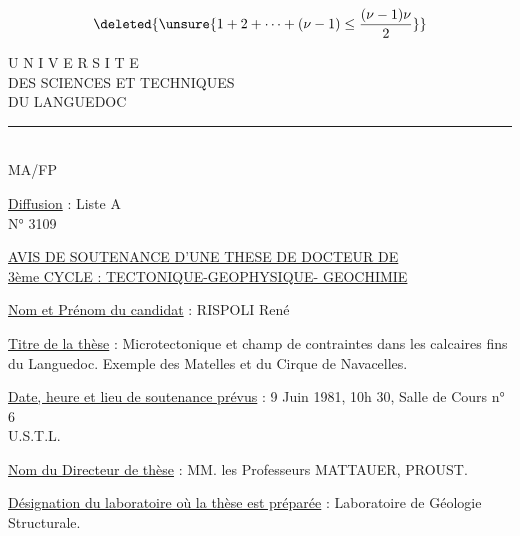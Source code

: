 

\[
\deleted{\unsure{1+2+\cdots+(\nu-1)\leq\frac{(\nu-1)\nu}{2}}}
\]


\begin{center}
U N I V E R S I T E\\
DES SCIENCES ET TECHNIQUES\\
DU LANGUEDOC\\
\rule{2.8cm}{.4pt}\\
MA/FP
\end{center}
\uline{Diffusion} : Liste A\\
N° 3109

\begin{center}
\uline{AVIS DE SOUTENANCE D'UNE THESE DE DOCTEUR DE}\\
\uline{3ème CYCLE : TECTONIQUE-GEOPHYSIQUE- GEOCHIMIE}
\end{center}

\uline{Nom et Prénom du candidat} : RISPOLI René

\uline{Titre de la thèse} : Microtectonique et champ de contraintes dans les calcaires fins du Languedoc. Exemple des Matelles et du Cirque de Navacelles.

\uline{Date, heure et lieu de soutenance prévus} : 9 Juin 1981, 10h 30, Salle de Cours n° 6\\
U.S.T.L.

\uline{Nom du Directeur de thèse} : MM. les Professeurs MATTAUER, PROUST.

\uline{Désignation du laboratoire où la thèse est préparée} : Laboratoire de Géologie Structurale.

